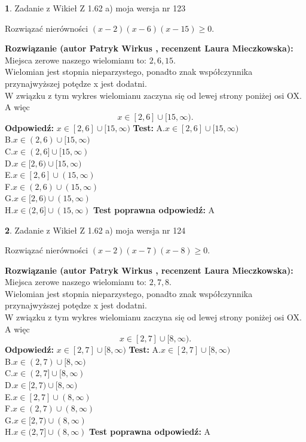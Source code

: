 \documentclass[12pt, a4paper]{article}
\theoremstyle{definition} %
\newtheorem{zad}{}
\newcommand{\zadStart}[1]{\begin{zad}#1\newline}
\newcommand{\zadStop}{\end{zad}}
\newcommand{\rozwStart}[2]{\noindent \textbf{Rozwiązanie (autor #1 , recenzent #2): }\newline}
\newcommand{\rozwStop}{\newline}
\newcommand{\odpStart}{\noindent \textbf{Odpowiedź:}\newline}
\newcommand{\odpStop}{\newline}
\newcommand{\testStart}{\noindent \textbf{Test:}\newline}
\newcommand{\testStop}{\newline}
\newcommand{\kluczStart}{\noindent \textbf{Test poprawna odpowiedź:}\newline}
\newcommand{\kluczStop}{\newline}
\begin{document}
\zadStart{Zadanie z Wikieł Z 1.62 a) moja wersja nr 123}

Rozwiązać nierówności $(x-2)(x-6)(x-15)\ge0$.
\zadStop
\rozwStart{Patryk Wirkus}{Laura Mieczkowska}
Miejsca zerowe naszego wielomianu to: $2, 6, 15$.\\
Wielomian jest stopnia nieparzystego, ponadto znak współczynnika przy\linebreak najwyższej potędze x jest dodatni.\\ W związku z tym wykres wielomianu zaczyna się od lewej strony poniżej osi OX. A więc $$x \in [2,6] \cup [15,\infty).$$
\rozwStop
\odpStart
$x \in [2,6] \cup [15,\infty)$
\odpStop
\testStart
A.$x \in [2,6] \cup [15,\infty)$\\
B.$x \in (2,6) \cup [15,\infty)$\\
C.$x \in (2,6] \cup [15,\infty)$\\
D.$x \in [2,6) \cup [15,\infty)$\\
E.$x \in [2,6] \cup (15,\infty)$\\
F.$x \in (2,6) \cup (15,\infty)$\\
G.$x \in [2,6) \cup (15,\infty)$\\
H.$x \in (2,6] \cup (15,\infty)$
\testStop
\kluczStart
A
\kluczStop



\zadStart{Zadanie z Wikieł Z 1.62 a) moja wersja nr 124}

Rozwiązać nierówności $(x-2)(x-7)(x-8)\ge0$.
\zadStop
\rozwStart{Patryk Wirkus}{Laura Mieczkowska}
Miejsca zerowe naszego wielomianu to: $2, 7, 8$.\\
Wielomian jest stopnia nieparzystego, ponadto znak współczynnika przy\linebreak najwyższej potędze x jest dodatni.\\ W związku z tym wykres wielomianu zaczyna się od lewej strony poniżej osi OX. A więc $$x \in [2,7] \cup [8,\infty).$$
\rozwStop
\odpStart
$x \in [2,7] \cup [8,\infty)$
\odpStop
\testStart
A.$x \in [2,7] \cup [8,\infty)$\\
B.$x \in (2,7) \cup [8,\infty)$\\
C.$x \in (2,7] \cup [8,\infty)$\\
D.$x \in [2,7) \cup [8,\infty)$\\
E.$x \in [2,7] \cup (8,\infty)$\\
F.$x \in (2,7) \cup (8,\infty)$\\
G.$x \in [2,7) \cup (8,\infty)$\\
H.$x \in (2,7] \cup (8,\infty)$
\testStop
\kluczStart
A
\kluczStop
\end{document}
